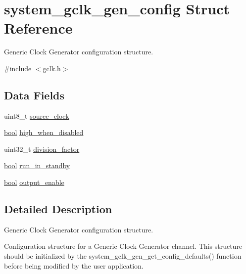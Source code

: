\hypertarget{structsystem__gclk__gen__config}{}\section{system\+\_\+gclk\+\_\+gen\+\_\+config Struct Reference}
\label{structsystem__gclk__gen__config}


Generic Clock Generator configuration structure.  




{\ttfamily \#include $<$gclk.\+h$>$}

\subsection*{Data Fields}
\begin{DoxyCompactItemize}
\item 
uint8\+\_\+t \mbox{\hyperlink{structsystem__gclk__gen__config_af287f9ec1ba1d3ca74d44f04ea746e5d}{source\+\_\+clock}}
\item 
\mbox{\hyperlink{group__group__sam0__utils_ga97a80ca1602ebf2303258971a2c938e2}{bool}} \mbox{\hyperlink{structsystem__gclk__gen__config_aa158600fe7c3ff45a31dad2b04764e8c}{high\+\_\+when\+\_\+disabled}}
\item 
uint32\+\_\+t \mbox{\hyperlink{structsystem__gclk__gen__config_a37cf9d2d48a7ee6ccd24794e781416f3}{division\+\_\+factor}}
\item 
\mbox{\hyperlink{group__group__sam0__utils_ga97a80ca1602ebf2303258971a2c938e2}{bool}} \mbox{\hyperlink{structsystem__gclk__gen__config_a514964d5c2a8da4dd96bac82a53477f2}{run\+\_\+in\+\_\+standby}}
\item 
\mbox{\hyperlink{group__group__sam0__utils_ga97a80ca1602ebf2303258971a2c938e2}{bool}} \mbox{\hyperlink{structsystem__gclk__gen__config_ae7532475a26f70b8f03eb662bcc14a91}{output\+\_\+enable}}
\end{DoxyCompactItemize}


\subsection{Detailed Description}
Generic Clock Generator configuration structure. 

Configuration structure for a Generic Clock Generator channel. This structure should be initialized by the system\+\_\+gclk\+\_\+gen\+\_\+get\+\_\+config\+\_\+defaults() function before being modified by the user application. 

